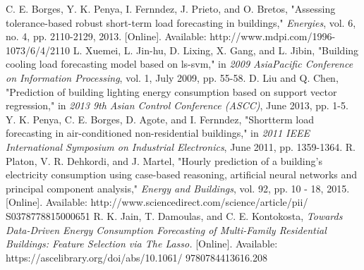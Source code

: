 \documentclass[conference]{IEEEtran}
\begin{document}
\begin{thebibliography}{00}
C. E. Borges, Y. K. Penya, I. Fernndez, J. Prieto, and O. Bretos,
"Assessing tolerance-based robust short-term load forecasting in
buildings," \textit{Energies}, vol. 6, no. 4, pp. 2110-2129, 2013. [Online].
	Available: http://www.mdpi.com/1996-1073/6/4/2110
 L. Xuemei, L. Jin-hu, D. Lixing, X. Gang, and L. Jibin, "Building
cooling load forecasting model based on ls-svm," in \textit{2009 AsiaPacific Conference on Information Processing}, vol. 1, July 2009,
pp. 55-58.
D. Liu and Q. Chen, "Prediction of building lighting energy consumption based on support vector regression," in \textit{2013 9th Asian
Control Conference (ASCC)}, June 2013, pp. 1-5.
Y. K. Penya, C. E. Borges, D. Agote, and I. Fernndez, "Shortterm load forecasting in air-conditioned non-residential buildings," in \textit{2011 IEEE International Symposium on Industrial
Electronics}, June 2011, pp. 1359-1364.
 R. Platon, V. R. Dehkordi, and J. Martel, "Hourly prediction of
a building’s electricity consumption using case-based reasoning,
artificial neural networks and principal component analysis,"
\textit{Energy and Buildings}, vol. 92, pp. 10 - 18, 2015. [Online].
	Available: http://www.sciencedirect.com/science/article/pii/
	S0378778815000651
 R. K. Jain, T. Damoulas, and C. E. Kontokosta, \textit{Towards
Data-Driven Energy Consumption Forecasting of Multi-Family
Residential Buildings: Feature Selection via The Lasso.}
[Online]. Available: https://ascelibrary.org/doi/abs/10.1061/
9780784413616.208


\end{thebibliography}
\end{document}
